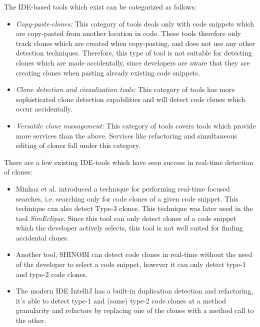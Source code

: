 \documentclass[12pt]{article}
\begin{document}
The IDE-based tools which exist can be categorized as
follows\cite[8]{Udding_Towards_Convenient_Management}:

\begin{itemize}
	\item\textit{Copy-paste-clones:} This category of tools deals only with code snippets which are
	copy-pasted from another location in code. These tools therefore only track clones which
	are created when copy-pasting, and does not use any other detection techniques. Therefore,
	this type of tool is not suitable for detecting clones which are made accidentally, since
	developers are aware that they are creating clones when pasting already existing code
	snippets.

	\item\textit{Clone detection and visualization tools:} This category of tools has more
	sophisticated clone detection capabilities and will detect code clones which occur
	accidentally.

	\item\textit{Versatile clone management:} This category of tools covers tools which provide more
	services than the above. Services like refactoring and simultaneous editing of clones fall
	under this category.
\end{itemize}

There are a few existing IDE-tools which have seen success in real-time detection of clones:

\begin{itemize}
	\item Minhaz et al. introduced a technique for performing real-time focused
	      searches, i.e. searching only for code clones of a given code snippet. This
	      technique can also detect Type-3 clones\cite{Zibran_real_time_search}.
	      This technique was later used in the tool
	      \textit{SimEclipse}\cite{Udding_Towards_Convenient_Management}. Since this tool
	      can only detect clones of a code snippet which the developer actively selects, this tool is
	      not well suited for finding accidental clones.

	\item Another tool, SHINOBI can detect code clones in real-time without the need
	      of the developer to select a code snippet, however it can only detect type-1
	      and type-2 code clones\cite{SHINOBI}.
	\item The modern IDE IntelliJ has a built-in duplication detection and
	      refactoring, it's able to detect type-1 and (some) type-2 code clones at a method
	      granularity and refactors by replacing one of the clones with a method call to
          the other.
\end{itemize}
\end{document}
